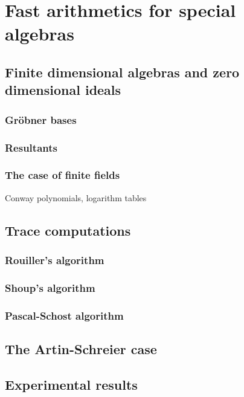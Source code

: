 \newcommand{\AS}[1]{\mathcal{#1}}  %
\newcommand{\biv}[1]{\mathfrak{#1}}  %
\newcommand{\vect}[1]{\vec{#1}}  %
\newcommand{\bs}{\mathbf{s}}  %
\newcommand{\bC}{\mathbf{C}}  %
\newcommand{\bB}{\mathbf{B}}  %
\newcommand{\bD}{\mathbf{D}}  %
\newcommand{\bP}{\mathbf{P}}  %

\newcommand{\sC}{\mathsf{K}}  %
\renewcommand{\L}{\mathsf{L}}  %

\part{Fast arithmetics for special algebras}

\chapter{Finite dimensional algebras and zero dimensional ideals}

\section{Gröbner bases}
\section{Resultants}
\section{The case of finite fields}
Conway polynomials, logarithm tables

\chapter{Trace computations}

\section{Rouiller's algorithm}
\section{Shoup's algorithm}
\section{Pascal-Schost algorithm}

\chapter{The Artin-Schreier case}







%

\chapter{Experimental results}



